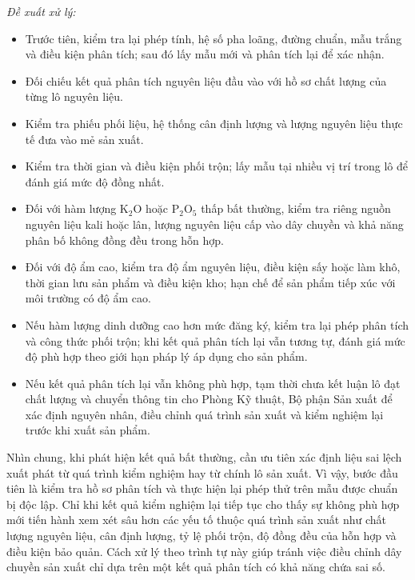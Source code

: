 \noindent\textit{Đề xuất xử lý:}
\begin{itemize}
  \item Trước tiên, kiểm tra lại phép tính, hệ số pha loãng, đường chuẩn, mẫu trắng và điều kiện phân tích; sau đó lấy mẫu mới và phân tích lại để xác nhận.
  \item Đối chiếu kết quả phân tích nguyên liệu đầu vào với hồ sơ chất lượng của từng lô nguyên liệu.
  \item Kiểm tra phiếu phối liệu, hệ thống cân định lượng và lượng nguyên liệu thực tế đưa vào mẻ sản xuất.
  \item Kiểm tra thời gian và điều kiện phối trộn; lấy mẫu tại nhiều vị trí trong lô để đánh giá mức độ đồng nhất.
  \item Đối với hàm lượng \(\mathrm{K_2O}\) hoặc \(\mathrm{P_2O_5}\) thấp bất thường, kiểm tra riêng nguồn nguyên liệu kali hoặc lân, lượng nguyên liệu cấp vào dây chuyền và khả năng phân bố không đồng đều trong hỗn hợp.
  \item Đối với độ ẩm cao, kiểm tra độ ẩm nguyên liệu, điều kiện sấy hoặc làm khô, thời gian lưu sản phẩm và điều kiện kho; hạn chế để sản phẩm tiếp xúc với môi trường có độ ẩm cao.
  \item Nếu hàm lượng dinh dưỡng cao hơn mức đăng ký, kiểm tra lại phép phân tích và công thức phối trộn; khi kết quả phân tích lại vẫn tương tự, đánh giá mức độ phù hợp theo giới hạn pháp lý áp dụng cho sản phẩm.
  \item Nếu kết quả phân tích lại vẫn không phù hợp, tạm thời chưa kết luận lô đạt chất lượng và chuyển thông tin cho Phòng Kỹ thuật, Bộ phận Sản xuất để xác định nguyên nhân, điều chỉnh quá trình sản xuất và kiểm nghiệm lại trước khi xuất sản phẩm.
\end{itemize}

Nhìn chung, khi phát hiện kết quả bất thường, cần ưu tiên xác định liệu sai lệch xuất phát từ quá trình kiểm nghiệm hay từ chính lô sản xuất. Vì vậy, bước đầu tiên là kiểm tra hồ sơ phân tích và thực hiện lại phép thử trên mẫu được chuẩn bị độc lập. Chỉ khi kết quả kiểm nghiệm lại tiếp tục cho thấy sự không phù hợp mới tiến hành xem xét sâu hơn các yếu tố thuộc quá trình sản xuất như chất lượng nguyên liệu, cân định lượng, tỷ lệ phối trộn, độ đồng đều của hỗn hợp và điều kiện bảo quản. Cách xử lý theo trình tự này giúp tránh việc điều chỉnh dây chuyền sản xuất chỉ dựa trên một kết quả phân tích có khả năng chứa sai số.
